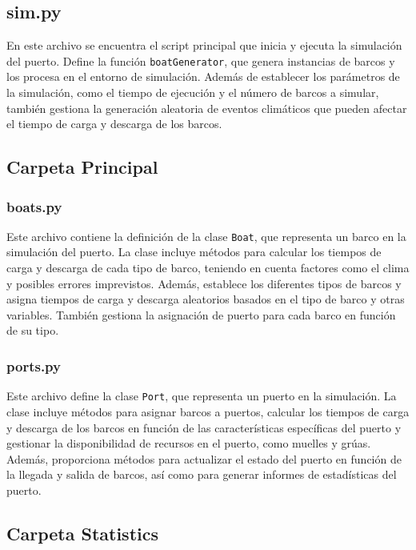\documentclass[12pt]{article}
\begin{document}
    \subsection{sim.py}
        En este archivo se encuentra el script principal que inicia y ejecuta la simulación del puerto. Define la función \texttt{boatGenerator}, que genera instancias de barcos y los procesa en el entorno de simulación. Además de establecer los parámetros de la simulación, como el tiempo de ejecución y el número de barcos a simular, también gestiona la generación aleatoria de eventos climáticos que pueden afectar el tiempo de carga y descarga de los barcos.\\

    \subsection{Carpeta Principal}
        \subsubsection{boats.py}
        Este archivo contiene la definición de la clase \texttt{Boat}, que representa un barco en la simulación del puerto. La clase incluye métodos para calcular los tiempos de carga y descarga de cada tipo de barco, teniendo en cuenta factores como el clima y posibles errores imprevistos. Además, establece los diferentes tipos de barcos y asigna tiempos de carga y descarga aleatorios basados en el tipo de barco y otras variables. También gestiona la asignación de puerto para cada barco en función de su tipo.\\

        \subsubsection{ports.py}
        Este archivo define la clase \texttt{Port}, que representa un puerto en la simulación. La clase incluye métodos para asignar barcos a puertos, calcular los tiempos de carga y descarga de los barcos en función de las características específicas del puerto y gestionar la disponibilidad de recursos en el puerto, como muelles y grúas. Además, proporciona métodos para actualizar el estado del puerto en función de la llegada y salida de barcos, así como para generar informes de estadísticas del puerto.

        
    \subsection{Carpeta Statistics}
\end{document}
